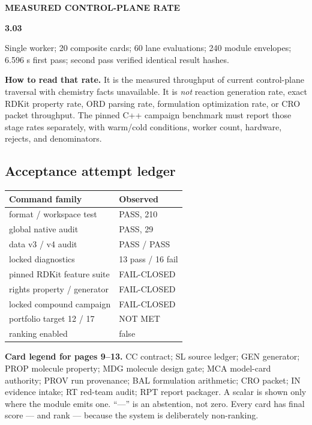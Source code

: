 \documentclass[10pt,a4paper]{article}
\begin{document}
\begin{minipage}[t]{.49\linewidth}
\begin{tcolorbox}[colback=Navy,colframe=Navy,arc=2mm,left=4mm,right=4mm,top=3mm,bottom=3mm]
{\color{Cyan}\sffamily\bfseries MEASURED CONTROL-PLANE RATE}\par
{\color{white}\sffamily\fontsize{28}{30}\selectfont\bfseries 3.03}\par
{\color{white!72}\fontsize{7.4}{9}\selectfont Single worker; 20 composite cards; 60 lane evaluations; 240 module envelopes; 6.596 s first pass; second pass verified identical result hashes.}
\end{tcolorbox}

\textbf{How to read that rate.} It is the measured throughput of current control-plane traversal with chemistry facts unavailable. It is \emph{not} reaction generation rate, exact RDKit property rate, ORD parsing rate, formulation optimization rate, or CRO packet throughput. The pinned C++ campaign benchmark must report those stage rates separately, with warm/cold conditions, worker count, hardware, rejects, and denominators.

\subsection*{Acceptance attempt ledger}
\begin{tabularx}{\linewidth}{@{}Y C{20mm}@{}}
\toprule \textbf{Command family} & \textbf{Observed} \\
\midrule
format / workspace test & PASS, 210 \\
global native audit & PASS, 29 \\
data v3 / v4 audit & PASS / PASS \\
locked diagnostics & 13 pass / 16 fail \\
pinned RDKit feature suite & FAIL-CLOSED \\
rights property / generator & FAIL-CLOSED \\
locked compound campaign & FAIL-CLOSED \\
portfolio target 12 / 17 & NOT MET \\
ranking enabled & false \\
\bottomrule
\end{tabularx}
\end{minipage}

\vspace{2mm}
\begin{tcolorbox}[colback=PaleBlue,colframe=Blue!35,boxrule=.5pt,arc=2mm,left=3mm,right=3mm,top=2mm,bottom=2mm]
\textbf{Card legend for pages 9--13.} CC contract; SL source ledger; GEN generator; PROP molecule property; MDG molecule design gate; MCA model-card authority; PROV run provenance; BAL formulation arithmetic; CRO packet; IN evidence intake; RT red-team audit; RPT report packager. A scalar is shown only where the module emits one. ``---'' is an abstention, not zero. Every card has final score --- and rank --- because the system is deliberately non-ranking.
\end{tcolorbox}
\end{document}
